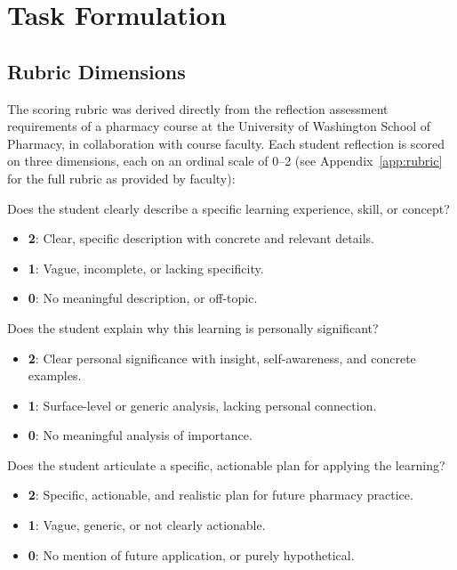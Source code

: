 \documentclass[11pt]{article}
\begin{document}
\section{Task Formulation}

\subsection{Rubric Dimensions}

The scoring rubric was derived directly from the reflection assessment requirements of a pharmacy course at the University of Washington School of Pharmacy, in collaboration with course faculty. Each student reflection is scored on three dimensions, each on an ordinal scale of 0--2 (see Appendix~\ref{app:rubric} for the full rubric as provided by faculty):


\begin{description}[leftmargin=2em, labelindent=0em]
    \item[\textbf{WHAT (Description).}] Does the student clearly describe a specific learning experience, skill, or concept?
    \begin{itemize}
        \item \textbf{2}: Clear, specific description with concrete and relevant details.
        \item \textbf{1}: Vague, incomplete, or lacking specificity.
        \item \textbf{0}: No meaningful description, or off-topic.
    \end{itemize}

    \item[\textbf{WHY (Analysis).}] Does the student explain why this learning is personally significant?
    \begin{itemize}
        \item \textbf{2}: Clear personal significance with insight, self-awareness, and concrete examples.
        \item \textbf{1}: Surface-level or generic analysis, lacking personal connection.
        \item \textbf{0}: No meaningful analysis of importance.
    \end{itemize}

    \item[\textbf{HOW (Integration).}] Does the student articulate a specific, actionable plan for applying the learning?
    \begin{itemize}
        \item \textbf{2}: Specific, actionable, and realistic plan for future pharmacy practice.
        \item \textbf{1}: Vague, generic, or not clearly actionable.
        \item \textbf{0}: No mention of future application, or purely hypothetical.
    \end{itemize}
\end{description}
\end{document}
